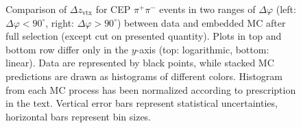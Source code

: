 \begin{figure}[h]
{\begin{subfigure}[b]{\linewidth}
  \end{subfigure} 
}\caption[Comparison of $\Delta z_{\text{vtx}}$ for CEP $\pi^{+}\pi^{-}$ events in two ranges of $\Delta\varphi$ between data and embedded MC.]{Comparison of $\Delta z_{\text{vtx}}$ for CEP $\pi^{+}\pi^{-}$ events in two ranges of $\Delta\varphi$ (left: $\Delta\varphi<90^{\circ}$, right: $\Delta\varphi>90^{\circ}$) between data and embedded MC after full selection (except cut on presented quantity). Plots in top and bottom row differ only in the $y$-axis (top: logarithmic, bottom: linear). Data are represented by black points, while stacked MC predictions are drawn as histograms of different colors. Histogram from each MC process has been normalized according to prescription in the text. Vertical error bars represent statistical uncertainties, horizontal bars represent bin sizes.}\label{fig:Ratio_DeltaZVtx_DeltaPhiBins}%
\end{figure}



